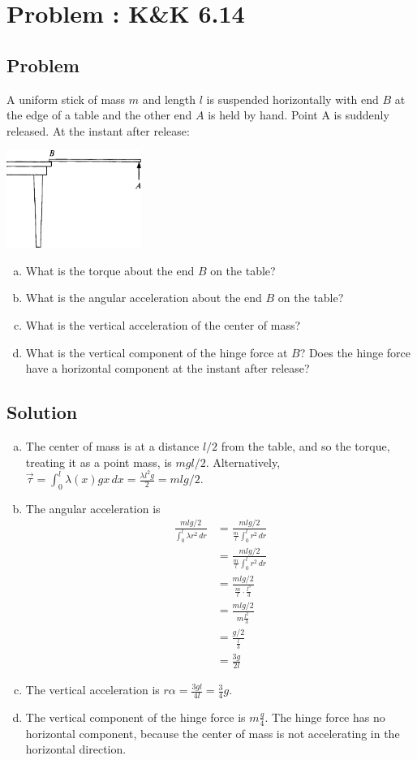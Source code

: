 \documentclass[solutions]{esg8012pset}
\date{\today }
\renewcommand{\d}{\,d}
\begin{document}
\section{Problem \thesection: K\&K 6.14}
\subsection{Problem}
  A uniform stick of mass $m$ and length $l$ is suspended horizontally with end $B$ at the edge of a table and the other end $A$ is held by hand. Point A is suddenly released. At the instant after release:
  \begin{center}\includegraphics[width=0.33\textwidth]{ps09_1}\end{center}
  \begin{enumerate}[(a)]
    \item What is the torque about the end $B$ on the table?
    \item What is the angular acceleration about the end $B$ on the table?
    \item What is the vertical acceleration of the center of mass?
    \item What is the vertical component of the hinge force at $B$? Does the hinge force have a horizontal component at the instant after release?
  \end{enumerate}
\subsection{Solution}
  \begin{enumerate}[(a)]
    \item The center of mass is at a distance $l / 2$ from the table, and so the torque, treating it as a point mass, is $m g l / 2$.  Alternatively, $\vec \tau = \int_0^l \lambda(x) g x \d x = \frac{\lambda l^2 g}{2} = m l g / 2$.
    \item The angular acceleration is \begin{align*}
      \frac{m l g / 2}{\int_0^l \lambda r^2 \d r} & = \frac{m l g / 2}{\frac{m}{l} \int_0^l r^2 \d r } \\
      & = \frac{m l g / 2}{\frac{m}{l} \int_0^l r^2 \d r } \\
      & = \frac{m l g / 2}{\frac{m}{l} \cdot \frac{l^3}{3} } \\
      & = \frac{m l g / 2}{m \frac{l^2}{3} } \\
      & = \frac{g / 2}{\frac{l}{3} } \\
      & = \frac{3 g}{2 l}
      \end{align*}
    \item The vertical acceleration is $r\alpha = \frac{3 g l}{4 l} = \frac{3}{4}g$.
    \item The vertical component of the hinge force is $m\frac{g}{4}$.  The hinge force has no horizontal component, because the center of mass is not accelerating in the horizontal direction.
  \end{enumerate}
\end{document}
